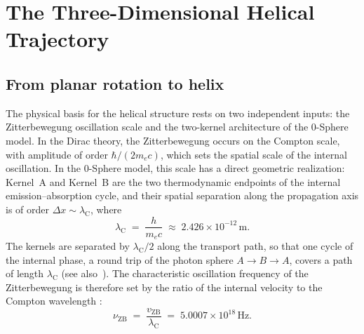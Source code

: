 \documentclass[%
 reprint, amsmath,amssymb, aps, prb, ]{revtex4-2}
\numberwithin{equation}{section}
\newcommand{\lambdaC}{\lambda_{\mathrm{C}}}
\begin{document}
\section{The Three-Dimensional Helical Trajectory}
\label{sec:helix}

\subsection{From planar rotation to helix}

The physical basis for the helical structure rests on two independent inputs: the Zitterbewegung oscillation scale and the two-kernel architecture of the 0-Sphere model. In the Dirac theory, the Zitterbewegung occurs on the Compton scale, with amplitude of order $\hbar/(2m_ec)$, which sets the spatial scale of the internal oscillation. In the 0-Sphere model, this scale has a direct geometric realization: Kernel~A and Kernel~B are the two thermodynamic endpoints of the internal emission--absorption cycle, and their spatial separation along the propagation axis is of order $\Delta x \sim \lambdaC$, where
\begin{equation}
\lambdaC \;=\; \frac{h}{m_e c} \;\approx\; 2.426 \times 10^{-12}\,\mathrm{m}.
\label{eq:compton}
\end{equation}
The kernels are separated by $\lambdaC/2$ along the transport path, so that one cycle of the internal phase, a round trip of the photon sphere $A\to B\to A$, covers a path of length $\lambdaC$ (see also~\cite{hanamura66}). The characteristic oscillation frequency of the Zitterbewegung is therefore set by the ratio of the internal velocity to the Compton wavelength \cite{hanamura36, hanamura66}:
\begin{equation}
\nu_{\mathrm{ZB}} \;=\; \frac{v_{\mathrm{ZB}}}{\lambdaC} \;=\; 5.0007 \times 10^{18}\,\mathrm{Hz}.
\label{eq:nu_zb}
\end{equation}
\end{document}
